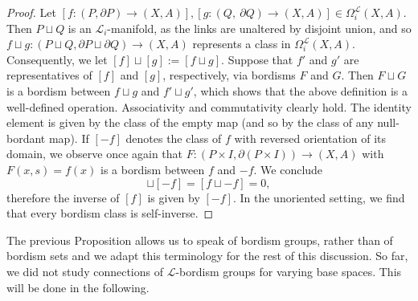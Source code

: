 \documentclass{scrreprt}
\begin{document}
\begin{proof}
Let $[f: (P, \partial P) \to (X,A)], [g: (Q,\ \partial Q) \to (X,A)] \in \Omega_i^{\mathcal{L}}(X,A)$. Then $P \sqcup Q$ is an $\mathcal{L}_i$-manifold, as the links are unaltered by disjoint union, and so $f \sqcup g: (P \sqcup Q, \partial P \sqcup \partial Q) \to (X,A)$ represents a class in $\Omega_i^{\mathcal{L}}(X,A)$. Consequently, we let $[f] \sqcup [g]:= [f \sqcup g]$. Suppose that $f'$ and $g'$ are representatives of $[f]$ and $[g]$, respectively, via bordisms $F$ and $G$. Then $F \sqcup G$ is a bordism between $f \sqcup g$ and $f' \sqcup g'$, which shows that the above definition is a well-defined operation. Associativity and commutativity clearly hold. The identity element is given by the class of the empty map (and so by the class of any null-bordant map). If $[-f]$ denotes the class of $f$ with reversed orientation of its domain, we observe once again that $F: (P \times I, \partial(P \times I)) \to (X,A)$ with $F(x,s)=f(x)$ is a bordism between $f$ and $-f$. We conclude
\begin{equation*}
[f] \sqcup [-f] = [f \sqcup -f] = 0 ,
\end{equation*}
therefore the inverse of $[f]$ is given by $[-f]$. In the unoriented setting, we find that every bordism class is self-inverse.
\end{proof}

The previous Proposition allows us to speak of bordism groups, rather than of bordism sets and we adapt this terminology for the rest of this discussion. \newline So far, we did not study connections of $\mathcal{L}$-bordism groups for varying base spaces. This will be done in the following.
\end{document}
